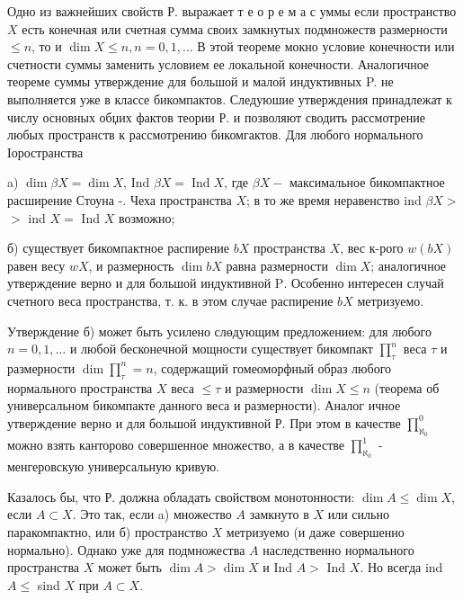 \documentclass[10pt]{article}
\begin{document}
Одно из важнейших свойств Р. выражает т е о р е м а с уммы если пространство $X$ есть конечная или счетная сумма своих замкнутых подмножеств размерности $\leqslant n$, то и $\operatorname{dim} X \leqslant n, n=0,1, \ldots$ В этой теореме мокно условие конечности или счетности суммы заменить условием ее локальной конечности. Аналогичное теореме суммы утверждение для большой и малой индуктивных P. не выполняется уже в классе бикомпактов. Следуюшие утверждения принадлежат к числу основных обџих фактов теории Р. и позволяют сводить рассмотрение любых пространств к рассмотрению бикомгактов. Для любого нормального Іоространства



a) $\operatorname{dim} \beta X=\operatorname{dim} X$, Ind $\beta X=\operatorname{Ind} X$, где $\beta X-$ максимальное бикомпактное расширение Стоуна -. Чеха пространства $X$; в то же время неравенство ind $\beta X>$ $>$ ind $X=$ Ind $X$ возможно;



б) существует бикомпактное распирение $b X$ пространства $X$, вес к-рого $w(b X)$ равен весу $w X$, и размерность $\operatorname{dim} b X$ равна размерности $\operatorname{dim} X$; аналогичное утверждение верно и для большой индуктивной $\mathrm{P}$. Особенно интересен случай счетного веса пространства, т. к. в этом случае распирение $b X$ метризуемо.



Утверждение б) может быть усилено слөдующим предложением: для любого $n=0,1, \ldots$ и любой бесконечной мощности существует бикомпакт $\prod_{\tau}^{n}$ веса $\tau$ и размерности $\operatorname{dim} \prod_{\tau}^{n}=n$, содержащий гомеоморфный образ любого нормального пространства $X$ веса $\leqslant \tau$ и размерности $\operatorname{dim} X \leqslant n$ (теорема об универсальном бикомпакте данного веса и размерности). Аналог ичное утверждение верно и для большой индуктивной Р. При этом в качестве $\prod_{\aleph_{0}}^{0}$ можно взять канторово совершенное множество, а в качестве $\prod_{\aleph_{0}}^{1}$ - менгеровскую универсальную кривую.



Казалось бы, что Р. должна обладать свойством монотонности: $\operatorname{dim} A \leqslant \operatorname{dim} X$, если $A \subset X$. Это так, если a) множество $A$ замкнуто в $X$ или сильно паракомпактно, или б) пространство $X$ метризуемо (и даже совершенно нормально). Однако уже для подмножества $A$ наследственно нормального пространства $X$ может быть $\operatorname{dim} A>\operatorname{dim} X$ и Ind $A>$ Ind $X$. Но всегда ind $A \leqslant$ sind $X$ при $A \subset X$.
\end{document}
